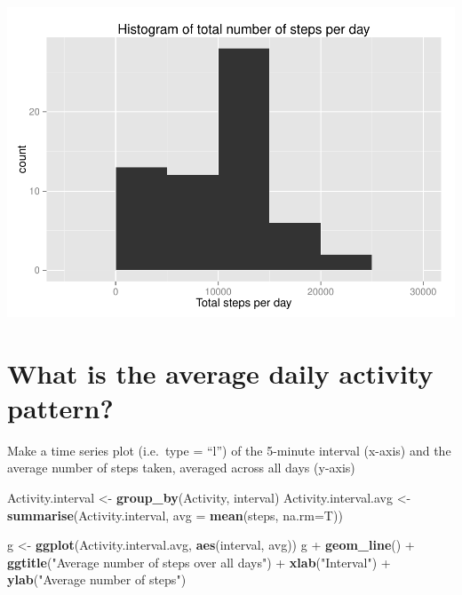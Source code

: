 \documentclass[]{article}
\newenvironment{Shaded}{\begin{snugshade}}{\end{snugshade}}
\newcommand{\KeywordTok}[1]{\textcolor[rgb]{0.13,0.29,0.53}{\textbf{{#1}}}}
\newcommand{\DataTypeTok}[1]{\textcolor[rgb]{0.13,0.29,0.53}{{#1}}}
\newcommand{\StringTok}[1]{\textcolor[rgb]{0.31,0.60,0.02}{{#1}}}
\newcommand{\NormalTok}[1]{{#1}}
\begin{document}
\includegraphics{PA1_template_files/figure-latex/unnamed-chunk-4-1.pdf}

\begin{Shaded}
\end{Shaded}

\section{What is the average daily activity
pattern?}\label{what-is-the-average-daily-activity-pattern}

Make a time series plot (i.e.~type = ``l'') of the 5-minute interval
(x-axis) and the average number of steps taken, averaged across all days
(y-axis)

\begin{Shaded}
\begin{Highlighting}[]
\NormalTok{Activity.interval <-}\StringTok{ }\KeywordTok{group_by}\NormalTok{(Activity, interval) }
\NormalTok{Activity.interval.avg <-}\StringTok{ }\KeywordTok{summarise}\NormalTok{(Activity.interval, }\DataTypeTok{avg =} \KeywordTok{mean}\NormalTok{(steps, }\DataTypeTok{na.rm=}\NormalTok{T))}
  

\NormalTok{g <-}\StringTok{ }\KeywordTok{ggplot}\NormalTok{(Activity.interval.avg, }\KeywordTok{aes}\NormalTok{(interval, avg))}
\NormalTok{g +}\StringTok{ }\KeywordTok{geom_line}\NormalTok{() +}\StringTok{ }\KeywordTok{ggtitle}\NormalTok{(}\StringTok{"Average number of steps over all days"}\NormalTok{) +}\StringTok{ }\KeywordTok{xlab}\NormalTok{(}\StringTok{"Interval"}\NormalTok{) +}\StringTok{ }\KeywordTok{ylab}\NormalTok{(}\StringTok{"Average number of steps"}\NormalTok{)}
\end{Highlighting}
\end{Shaded}
\end{document}
